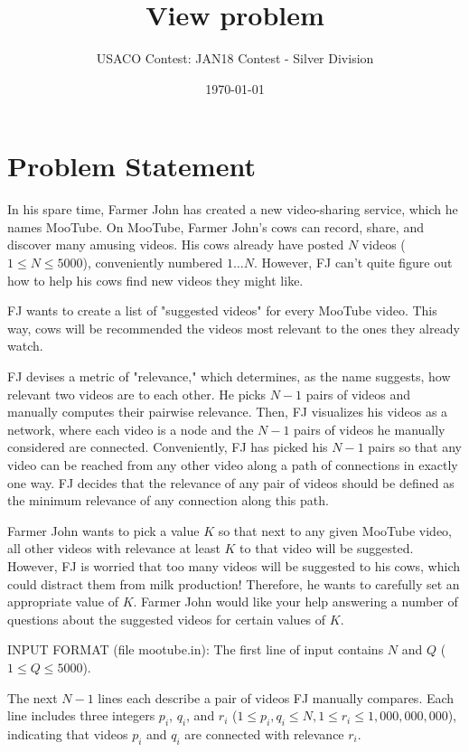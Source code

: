 \documentclass[12pt]{article}
\title{View problem}
\author{USACO Contest: JAN18 Contest - Silver Division}
\date{\today}
\begin{document}
\maketitle

\section*{Problem Statement}

In his spare time, Farmer John has created a new video-sharing service, which he
names MooTube.  On MooTube, Farmer John's cows can record, share, and discover
many amusing videos.  His cows already have posted $N$ videos ($1 \leq N \leq 5000$), conveniently numbered $1 \ldots N$.  However, FJ can't
quite figure out how to help his cows find new videos they might like.

FJ wants to create a list of "suggested videos" for every MooTube video.  This
way, cows will be recommended the videos most relevant to the ones they already
watch.

FJ devises a metric of "relevance," which determines, as the name suggests, how
relevant two videos are to each other.  He picks $N-1$ pairs of videos and
manually computes their pairwise relevance.  Then, FJ visualizes his videos as a
network, where each video is a node and the $N-1$ pairs of videos he manually
considered are connected.  Conveniently, FJ has picked his $N-1$ pairs so that
any video can be  reached from any other video along a path of connections in
exactly one way. FJ decides that the relevance of any pair of videos should be
defined as the minimum relevance of any connection along this path.  

Farmer John wants to pick a value $K$ so that next to any given MooTube video,
all other videos with relevance at least $K$ to that video will be suggested. 
However, FJ is worried that too many videos will be suggested to his cows, which
could distract them from milk production!  Therefore, he wants to carefully set
an appropriate value of $K$.  Farmer John would like your help answering a
number of questions about the suggested videos for certain values of $K$.

INPUT FORMAT (file mootube.in):
The first line of input contains $N$ and $Q$ ($1 \leq Q \leq 5000$).

The next $N-1$ lines each describe a pair of videos FJ manually compares.  Each
line includes three integers $p_i$, $q_i$, and $r_i$
($1 \leq p_i, q_i \leq N, 1 \leq r_i \leq 1,000,000,000$), indicating that
videos $p_i$ and $q_i$ are connected with relevance $r_i$.  
\end{document}
